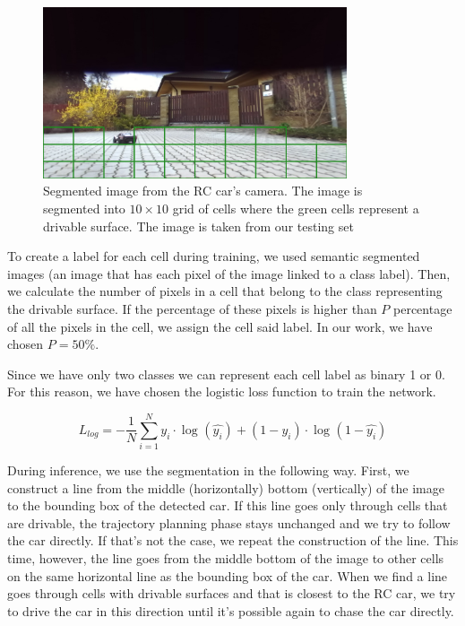 \begin{figure}[h!]
    \centering
    \includegraphics[width=0.8\textwidth]{images/segmented_image.png}
    
    \caption{Segmented image from the RC car's camera. The image is segmented into $10\times 10$ grid of cells where the green cells represent a drivable surface. The image is taken from our testing set}\label{f:chasing_diagram}
\end{figure}

To create a label for each cell during training, we used semantic segmented images (an image that has each pixel of the image linked to a class label). Then, we calculate the number of pixels in a cell that belong to the class representing the drivable surface. If the percentage of these pixels is higher than $P$ percentage of all the pixels in the cell, we assign the cell said label. In our work, we have chosen $P=50\%$.\par


Since we have only two classes we can represent each cell label as binary 1 or 0. For this reason, we have chosen the logistic loss function to train the network. \par

\begin{equation}
L_{log} = -\dfrac{1}{N} \sum_{i=1}^{N} y_i \cdot \log_{} (\hat{y_i}) + (1 - y_i) \cdot \log_{} (1-\hat{y_i})
\end{equation}

During inference, we use the segmentation in the following way. First, we construct a line from the middle (horizontally) bottom (vertically) of the image to the bounding box of the detected car. If this line goes only through cells that are drivable, the trajectory planning phase stays unchanged and we try to follow the car directly. If that's not the case, we repeat the construction of the line. This time, however, the line goes from the middle bottom of the image to other cells on the same horizontal line as the bounding box of the car. When we find a line goes through cells with drivable surfaces and that is closest to the RC car, we try to drive the car in this direction until it's possible again to chase the car directly.




